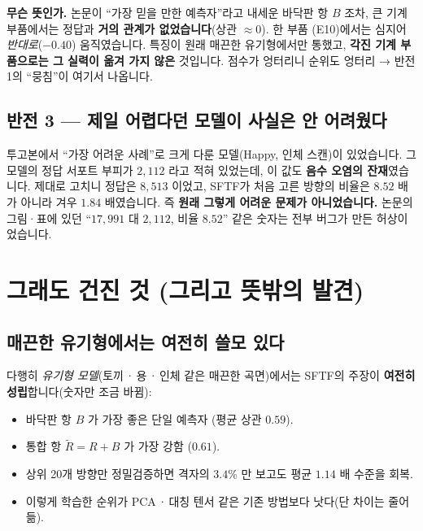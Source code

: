 \documentclass[11pt,a4paper]{article}
\begin{document}
\begin{notebox}
\textbf{무슨 뜻인가.} 논문이 ``가장 믿을 만한 예측자''라고 내세운 바닥판 항 $B$ 조차,
큰 기계 부품에서는 정답과 \textbf{거의 관계가 없었습니다}(상관 $\approx 0$). 한 부품
(E10)에서는 심지어 \emph{반대로}($-0.40$) 움직였습니다. 특징이 원래 매끈한
유기형에서만 통했고, \textbf{각진 기계 부품으로는 그 실력이 옮겨 가지 않은} 것입니다.
점수가 엉터리니 순위도 엉터리 → 반전 1의 ``뭉침''이 여기서 나옵니다.
\end{notebox}

\subsection{반전 3 — 제일 어렵다던 모델이 사실은 안 어려웠다}

투고본에서 ``가장 어려운 사례''로 크게 다룬 모델(Happy, 인체 스캔)이 있었습니다.
그 모델의 정답 서포트 부피가 $2{,}112$ 라고 적혀 있었는데, 이 값도 \textbf{음수 오염의
잔재}였습니다. 제대로 고치니 정답은 $8{,}513$ 이었고, SFTF가 처음 고른 방향의 비율은
$8.52$ 배가 아니라 겨우 $1.84$ 배였습니다. 즉 \textbf{원래 그렇게 어려운 문제가
아니었습니다.} 논문의 그림·표에 있던 ``$17{,}991$ 대 $2{,}112$, 비율 $8.52$'' 같은
숫자는 전부 버그가 만든 허상이었습니다.

\section{그래도 건진 것 (그리고 뜻밖의 발견)}

\subsection{매끈한 유기형에서는 여전히 쓸모 있다}

다행히 \emph{유기형 모델}(토끼\,·\,용\,·\,인체 같은 매끈한 곡면)에서는 SFTF의 주장이
\textbf{여전히 성립}합니다(숫자만 조금 바뀜):
\begin{itemize}[leftmargin=1.4em]
  \item 바닥판 항 $B$ 가 가장 좋은 단일 예측자 (평균 상관 $0.59$).
  \item 통합 항 $\tilde R=R+B$ 가 가장 강함 ($0.61$).
  \item 상위 20개 방향만 정밀검증하면 격자의 $3.4\%$ 만 보고도 평균 $1.14$ 배 수준을 회복.
  \item 이렇게 학습한 순위가 PCA\,·\,대칭 텐서 같은 기존 방법보다 낫다(단 차이는 줄어듦).
\end{itemize}
\end{document}
